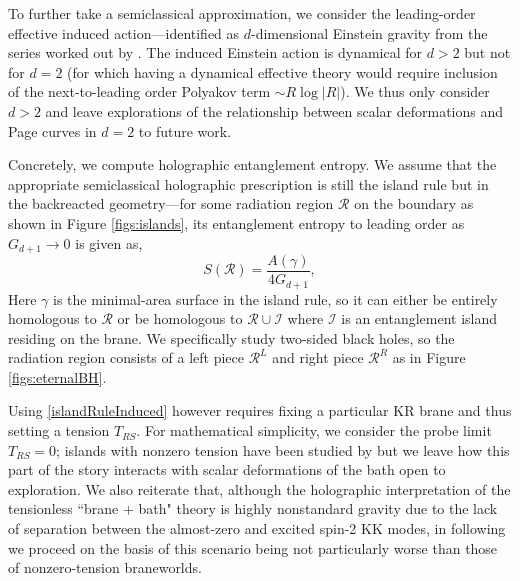 \documentclass[12pt,a4paper]{article}
\newcommand{\sanjit}[1]{\textcolor{red}{\textbf{??SS:} #1}}
\begin{document}
To further take a semiclassical approximation, we consider the leading-order effective induced action---identified as $d$-dimensional Einstein gravity from the series worked out by \cite{Chen:2020uac}. The induced Einstein action is dynamical for $d > 2$ but not for $d = 2$ (for which having a dynamical effective theory would require inclusion of the next-to-leading order Polyakov term $\sim R\log|R|$). We thus only consider $d > 2$ and leave explorations of the relationship between scalar deformations and Page curves in $d = 2$ to future work.

Concretely, we compute holographic entanglement entropy. We assume that the appropriate semiclassical holographic prescription is still the island rule \cite{Penington:2019npb,Almheiri:2019psf,Almheiri:2019hni,Almheiri:2020cfm} but in the backreacted geometry---for some radiation region $\mathcal{R}$ on the boundary as shown in Figure \ref{figs:islands}, its entanglement entropy to leading order as $G_{d+1} \to 0$ is given as,
\begin{equation}
S(\mathcal{R}) = \frac{A(\gamma)}{4G_{d+1}},\label{islandRuleInduced}
\end{equation}
Here $\gamma$ is the minimal-area surface in the island rule, so it can either be entirely homologous to $\mathcal{R}$ or be homologous to $\mathcal{R} \cup \mathcal{I}$ where $\mathcal{I}$ is an entanglement island residing on the brane. We specifically study two-sided black holes, so the radiation region consists of a left piece $\mathcal{R}^L$ and right piece $\mathcal{R}^R$ as in Figure \ref{figs:eternalBH}.

Using \eqref{islandRuleInduced} however requires fixing a particular KR brane and thus setting a tension $T_{RS}$. For mathematical simplicity, we consider the probe limit $T_{RS} = 0$; islands with nonzero tension have been studied by \cite{Almheiri:2019psy,Geng:2020qvw,Geng:2020fxl,Chen:2020uac,Chen:2020hmv} but we leave how this part of the story interacts with scalar deformations of the bath open to exploration. We also reiterate that, although the holographic interpretation of the tensionless ``brane + bath" theory is highly nonstandard gravity due to the lack of separation between the almost-zero and excited spin-2 KK modes, in following \cite{Geng:2020fxl} we proceed on the basis of this scenario being not particularly worse than those of nonzero-tension braneworlds.
\end{document}
